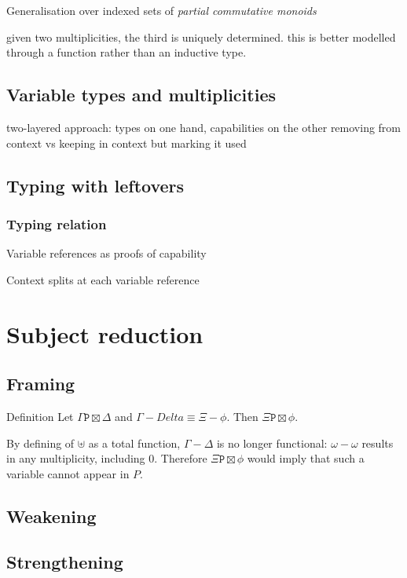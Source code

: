 \documentclass[a4paper,UKenglish,cleveref, autoref, thm-restate,authorcolumns]{lipics-v2019}
\newcommand{\type}{\texttt}
\begin{document}
Generalisation over indexed sets of \emph{partial commutative monoids}

given two multiplicities, the third is uniquely determined. this is better modelled through a function rather than an inductive type.

\subsection{Variable types and multiplicities}

two-layered approach: types on one hand, capabilities on the other
removing from context vs keeping in context but marking it used

\subsection{Typing with leftovers}

\subsubsection{Typing relation}

Variable references as proofs of capability

Context splits at each variable reference

\section{Subject reduction}

\subsection{Framing}

Definition
Let $\Gamma \type P \boxtimes \Delta$ and $\Gamma - Delta \equiv \Xi - \phi$.
Then $\Xi \type P \boxtimes \phi$.

By defining of $\uplus$ as a total function, $\Gamma - \Delta$ is no longer
functional: $\omega - \omega$ results in any multiplicity, including $0$. Therefore
$\Xi \type P \boxtimes \phi$ would imply that such a variable cannot appear in $P$.

\subsection{Weakening}

\subsection{Strengthening}
\end{document}
